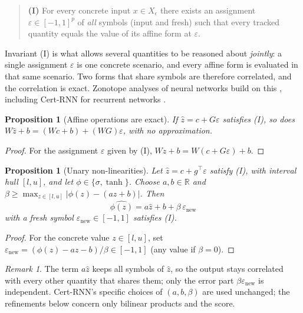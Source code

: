 \documentclass[11pt]{article}
\newtheorem{proposition}[theorem]{Proposition}
\theoremstyle{definition}
\theoremstyle{remark}
\newtheorem{remark}[theorem]{Remark}
\newcommand{\R}{\mathbb{R}}
\newcommand{\eps}{\varepsilon}
\newcommand{\abs}[1]{\left\lvert #1 \right\rvert}
\begin{document}
\begin{quote}
\textbf{(I)} For every concrete input $x\in X_\epsilon$ there exists an assignment $\eps\in[-1,1]^p$ of \emph{all} symbols (input and fresh) such that every tracked quantity equals the value of its affine form at $\eps$.
\end{quote}

Invariant (I) is what allows several quantities to be reasoned about \emph{jointly}: a single assignment $\eps$ is one concrete scenario, and every affine form is evaluated in that same scenario. Two forms that share symbols are therefore correlated, and the correlation is exact. Zonotope analyses of neural networks build on this \cite{ghorbal2009,gehr2018,singh2018}, including Cert-RNN for recurrent networks \cite{du2021}.

\begin{proposition}[Affine operations are exact]
If $\hat z = c + G\eps$ satisfies (I), so does $W\hat z + b = (Wc + b) + (WG)\eps$, with no approximation.
\end{proposition}
\begin{proof}
For the assignment $\eps$ given by (I), $Wz + b = W(c+G\eps) + b$.
\end{proof}

\begin{proposition}[Unary non-linearities]
Let $\hat z = c + g^\top\eps$ satisfy (I), with interval hull $[l,u]$, and let $\phi\in\{\sigma,\tanh\}$. Choose $a, b\in\R$ and $\beta \ge \max_{z\in[l,u]}\abs{\phi(z) - (az+b)}$. Then
\begin{equation}
\widehat{\phi(z)} = a\hat z + b + \beta\,\eps_{\mathrm{new}}
\end{equation}
with a fresh symbol $\eps_{\mathrm{new}}\in[-1,1]$ satisfies (I).
\end{proposition}
\begin{proof}
For the concrete value $z\in[l,u]$, set $\eps_{\mathrm{new}} = (\phi(z) - az - b)/\beta \in [-1,1]$ (any value if $\beta = 0$).
\end{proof}

\begin{remark}
The term $a\hat z$ keeps all symbols of $\hat z$, so the output stays correlated with every other quantity that shares them; only the error part $\beta\eps_{\mathrm{new}}$ is independent. Cert-RNN's specific choices of $(a,b,\beta)$ \cite{du2021} are used unchanged; the refinements below concern only bilinear products and the score.
\end{remark}
\end{document}
